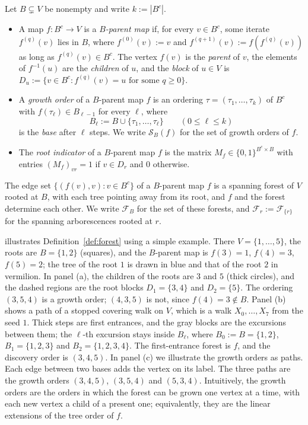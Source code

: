 \documentclass[onefignum,onetabnum]{siamart250211}
\numberwithin{theorem}{section}
\numberwithin{equation}{section}
\newcommand{\Orders}{\mathcal{S}}
\newcommand{\Fset}{\mathcal{F}}
\begin{document}
\begin{definition}\label{def:forest}
Let $B\subsetneq V$ be nonempty and write $k:=|B^c|$.
\begin{itemize}
\item[(a)] A map $f:B^c\to V$ is a \emph{$B$-parent map} if, for every
$v\in B^c$, some iterate $f^{(q)}(v)$ lies in $B$, where $f^{(0)}(v):=v$
and $f^{(q+1)}(v):=f(f^{(q)}(v))$ as long as $f^{(q)}(v)\in B^c$. The
vertex $f(v)$ is the \emph{parent} of $v$, the elements of
$f^{-1}(u)$ are the \emph{children} of $u$, and the \emph{block} of
$u\in V$ is $D_u:=\{v\in B^c:f^{(q)}(v)=u\text{ for some }q\ge0\}$.
\item[(b)] A \emph{growth order} of a $B$-parent map $f$ is an ordering
$\tau=(\tau_1,\dots,\tau_k)$ of $B^c$ with $f(\tau_\ell)\in B_{\ell-1}$ for
every $\ell$, where
\begin{equation}\label{eq:base}
B_\ell:=B\cup\{\tau_1,\dots,\tau_\ell\}\qquad(0\le \ell\le k)
\end{equation}
is the \emph{base} after $\ell$ steps. We write $\Orders_B(f)$ for the
set of growth orders of $f$.
\item[(c)] The \emph{root indicator} of a $B$-parent map $f$ is the matrix
$M_f\in\{0,1\}^{B^c\times B}$ with entries $(M_f)_{vr}=1$ if
$v\in D_r$ and $0$ otherwise.
\end{itemize}
\end{definition}


The edge set $\{(f(v),v):v\in B^c\}$ of a $B$-parent map $f$ is a spanning
forest of $V$ rooted at $B$, with each tree pointing away from its
root, and $f$ and the forest determine each other. We write $\Fset_B$
for the set of these forests, and $\Fset_r:=\Fset_{\{r\}}$ for the
spanning arborescences rooted at $r$.

 illustrates Definition~\ref{def:forest} using a simple example. There $V=\{1,\dots,5\}$, the roots are
$B=\{1,2\}$ (squares), and the $B$-parent map is $f(3)=1$, $f(4)=3$,
$f(5)=2$; the tree of the root $1$ is drawn in blue and that of the root
$2$ in vermilion. In panel (a), the children of the
roots are $3$ and $5$ (thick circles), and the dashed regions are the
root blocks $D_1=\{3,4\}$ and $D_2=\{5\}$. The ordering $(3,5,4)$ is a
growth order; $(4,3,5)$ is not, since $f(4)=3\notin B$. Panel (b) shows a path of a stopped covering walk on $V$, which is a walk $X_0,\dots,X_7$ from the seed $1$. Thick steps are first entrances, and the gray blocks are the excursions between them; the $\ell$-th excursion stays inside $B_\ell$, where $B_0:=B=\{1,2\}$,
$B_1=\{1,2,3\}$ and $B_2=\{1,2,3,4\}$. The first-entrance forest is $f$,
and the discovery order is $(3,4,5)$. In panel (c) we illustrate the growth orders as paths. Each edge between two bases adds the vertex on its label. The three paths are the growth orders $(3,4,5)$, $(3,5,4)$ and $(5,3,4)$. Intuitively, the growth orders are the orders in which the forest can be grown one vertex at a time, with each new vertex a child of a present one; equivalently, they are the linear extensions of the tree order of $f$.
\end{document}
